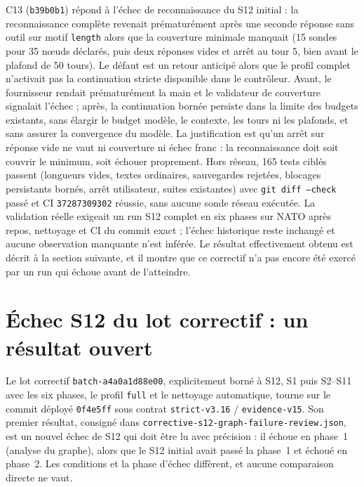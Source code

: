\documentclass[11pt,a4paper]{article}
\newcommand{\code}[1]{{\urlstyle{tt}\nolinkurl{#1}}}
\begin{document}
C13 (\code{b39b0b1}) répond à l'échec de reconnaissance du S12 initial : la reconnaissance complète revenait prématurément après une seconde réponse sans outil sur motif \code{length} alors que la couverture minimale manquait (15 sondes pour 35 n\oe{}uds déclarés, puis deux réponses vides et arrêt au tour 5, bien avant le plafond de 50 tours). Le défaut est un retour anticipé alors que le profil complet n'activait pas la continuation stricte disponible dans le contrôleur. Avant, le fournisseur rendait prématurément la main et le validateur de couverture signalait l'échec ; après, la continuation bornée persiste dans la limite des budgets existants, sans élargir le budget modèle, le contexte, les tours ni les plafonds, et sans assurer la convergence du modèle. La justification est qu'un arrêt sur réponse vide ne vaut ni couverture ni échec franc : la reconnaissance doit soit couvrir le minimum, soit échouer proprement. Hors réseau, 165 tests ciblés passent (longueurs vides, textes ordinaires, sauvegardes rejetées, blocages persistants bornés, arrêt utilisateur, suites existantes) avec \texttt{git diff --check} passé et CI \code{37287309302} réussie, sans aucune sonde réseau exécutée. La validation réelle exigeait un run S12 complet en six phases sur NATO après repos, nettoyage et CI du commit exact ; l'échec historique reste inchangé et aucune observation manquante n'est inférée. Le résultat effectivement obtenu est décrit à la section suivante, et il montre que ce correctif n'a pas encore été exercé par un run qui échoue avant de l'atteindre.

\section{Échec S12 du lot correctif : un résultat ouvert}
\label{sec:s12-nouveau}

Le lot correctif \code{batch-a4a0a1d88e00}, explicitement borné à S12, S1 puis S2--S11 avec les six phases, le profil \code{full} et le nettoyage automatique, tourne sur le commit déployé \code{0f4e5ff} sous contrat \code{strict-v3.16} / \code{evidence-v15}. Son premier résultat, consigné dans \code{corrective-s12-graph-failure-review.json}, est un nouvel échec de S12 qui doit être lu avec précision : il échoue en phase~1 (analyse du graphe), alors que le S12 initial avait passé la phase~1 et échoué en phase~2. Les conditions et la phase d'échec diffèrent, et aucune comparaison directe ne vaut.
\end{document}
